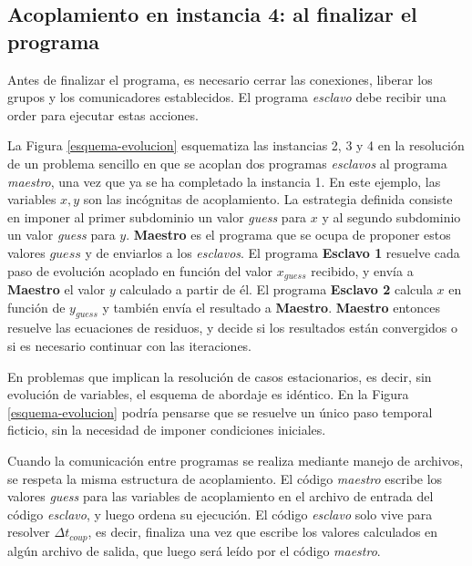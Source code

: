 \subsection*{Acoplamiento en instancia 4: al finalizar el programa}

Antes de finalizar el programa, es necesario cerrar las conexiones, liberar los grupos y los comunicadores establecidos.
El programa \textit{esclavo} debe recibir una order para ejecutar estas acciones.

\bigskip

La Figura \ref{esquema-evolucion} esquematiza las instancias 2, 3 y 4 en la resolución de un problema sencillo
en que se acoplan dos programas \textit{esclavos} al programa \textit{maestro},
una vez que ya se ha completado la instancia 1.
En este ejemplo, las variables $x,y$ son las incógnitas de acoplamiento.
La estrategia definida consiste en imponer al primer subdominio un valor \textit{guess} para $x$ y al segundo subdominio un valor \textit{guess} para $y$.
\textbf{Maestro} es el programa que se ocupa de proponer estos valores $guess$ y de enviarlos a los \textit{esclavos}.
El programa \textbf{Esclavo 1} resuelve cada paso de evolución acoplado en función del valor $x_{guess}$ recibido, y envía a \textbf{Maestro} el valor $y$ calculado a partir de él.
El programa \textbf{Esclavo 2} calcula $x$ en función de $y_{guess}$ y también envía el resultado a \textbf{Maestro}.
\textbf{Maestro} entonces resuelve las ecuaciones de residuos, y decide si los resultados están convergidos o si es necesario continuar con las iteraciones.

En problemas que implican la resolución de casos estacionarios, es decir, sin evolución de variables, el esquema de abordaje es idéntico.
En la Figura \ref{esquema-evolucion} podría pensarse que se resuelve un único paso temporal ficticio, sin la necesidad de imponer condiciones iniciales.

Cuando la comunicación entre programas se realiza mediante manejo de archivos, se respeta la misma estructura de acoplamiento.
El código \textit{maestro} escribe los valores \textit{guess} para las variables de acoplamiento en el archivo de entrada del código \textit{esclavo}, y luego ordena su ejecución.
El código \textit{esclavo} solo vive para resolver $\Delta t_{coup}$, es decir, finaliza una vez que escribe los valores calculados en algún archivo de salida,
que luego será leído por el código \textit{maestro}.

